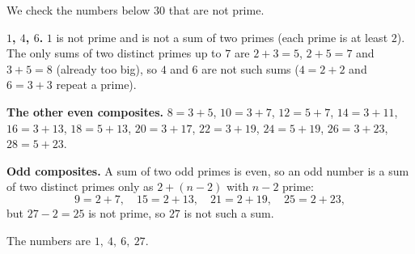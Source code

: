 We check the numbers below $30$ that are not prime.

\textbf{$1$, $4$, $6$.} $1$ is not prime and is not a sum of two primes (each prime is at least $2$). The only sums of two distinct primes up to $7$ are $2+3=5$, $2+5=7$ and $3+5=8$ (already too big), so $4$ and $6$ are not such sums ($4=2+2$ and $6=3+3$ repeat a prime).

\textbf{The other even composites.} $8=3+5$, $10=3+7$, $12=5+7$, $14=3+11$, $16=3+13$, $18=5+13$, $20=3+17$, $22=3+19$, $24=5+19$, $26=3+23$, $28=5+23$.

\textbf{Odd composites.} A sum of two odd primes is even, so an odd number is a sum of two distinct primes only as $2+(n-2)$ with $n-2$ prime:
\[
9=2+7,\quad 15=2+13,\quad 21=2+19,\quad 25=2+23,
\]
but $27-2=25$ is not prime, so $27$ is not such a sum.

The numbers are $\boxed{1,\ 4,\ 6,\ 27}$.

